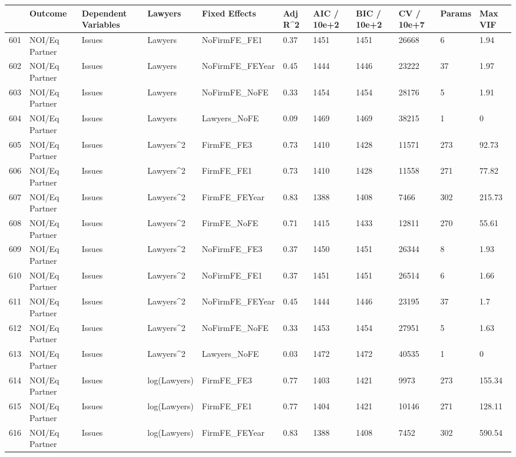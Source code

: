 \begin{table}[ht]
\centering
\begin{tabular}{rllllllllll}
  \hline
 & Outcome & Dependent Variables & Lawyers & Fixed Effects & Adj R^2 & AIC / 10e+2 & BIC / 10e+2 & CV / 10e+7 & Params & Max VIF \\ 
  \hline
601 & NOI/Eq Partner & Issues & Lawyers & NoFirmFE\_FE1 & 0.37 & 1451 & 1451 & 26668 & 6 & 1.94 \\ 
  602 & NOI/Eq Partner & Issues & Lawyers & NoFirmFE\_FEYear & 0.45 & 1444 & 1446 & 23222 & 37 & 1.97 \\ 
  603 & NOI/Eq Partner & Issues & Lawyers & NoFirmFE\_NoFE & 0.33 & 1454 & 1454 & 28176 & 5 & 1.91 \\ 
  604 & NOI/Eq Partner & Issues & Lawyers & Lawyers\_NoFE & 0.09 & 1469 & 1469 & 38215 & 1 & 0 \\ 
  605 & NOI/Eq Partner & Issues & Lawyers^2 & FirmFE\_FE3 & 0.73 & 1410 & 1428 & 11571 & 273 & 92.73 \\ 
  606 & NOI/Eq Partner & Issues & Lawyers^2 & FirmFE\_FE1 & 0.73 & 1410 & 1428 & 11558 & 271 & 77.82 \\ 
  607 & NOI/Eq Partner & Issues & Lawyers^2 & FirmFE\_FEYear & 0.83 & 1388 & 1408 & 7466 & 302 & 215.73 \\ 
  608 & NOI/Eq Partner & Issues & Lawyers^2 & FirmFE\_NoFE & 0.71 & 1415 & 1433 & 12811 & 270 & 55.61 \\ 
  609 & NOI/Eq Partner & Issues & Lawyers^2 & NoFirmFE\_FE3 & 0.37 & 1450 & 1451 & 26344 & 8 & 1.93 \\ 
  610 & NOI/Eq Partner & Issues & Lawyers^2 & NoFirmFE\_FE1 & 0.37 & 1451 & 1451 & 26514 & 6 & 1.66 \\ 
  611 & NOI/Eq Partner & Issues & Lawyers^2 & NoFirmFE\_FEYear & 0.45 & 1444 & 1446 & 23195 & 37 & 1.7 \\ 
  612 & NOI/Eq Partner & Issues & Lawyers^2 & NoFirmFE\_NoFE & 0.33 & 1453 & 1454 & 27951 & 5 & 1.63 \\ 
  613 & NOI/Eq Partner & Issues & Lawyers^2 & Lawyers\_NoFE & 0.03 & 1472 & 1472 & 40535 & 1 & 0 \\ 
  614 & NOI/Eq Partner & Issues & log(Lawyers) & FirmFE\_FE3 & 0.77 & 1403 & 1421 & 9973 & 273 & 155.34 \\ 
  615 & NOI/Eq Partner & Issues & log(Lawyers) & FirmFE\_FE1 & 0.77 & 1404 & 1421 & 10146 & 271 & 128.11 \\ 
  616 & NOI/Eq Partner & Issues & log(Lawyers) & FirmFE\_FEYear & 0.83 & 1388 & 1408 & 7452 & 302 & 590.54 \\ 

\end{tabular}
\end{table}

